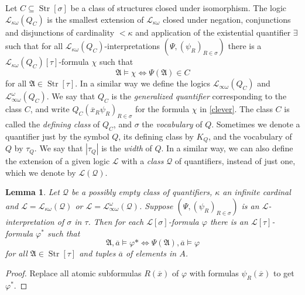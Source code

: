 \documentclass{ndjflart}
\theoremstyle{plain}
\newtheorem{lemma}[conjecture]{Lemma}
\theoremstyle{definition}
\numberwithin{equation}{section}
\DeclareMathOperator{\Str}{Str}
\begin{document}
Let $C \subseteq \Str[\sigma]$ be a class of structures closed under isomorphism.
The logic $\mathcal{L}_{\kappa\omega}(Q_C)$ is the smallest extension of $\mathcal{L}_{\kappa\omega}$ closed under negation, conjunctions and disjunctions of cardinality $<\kappa$ and application of the existential quantifier $\exists$ such that  for all
$\mathcal{L}_{\kappa\omega}(Q_C)$-interpretations $(\Psi,(\psi_R)_{R\in \sigma})$ there is a $\mathcal{L}_{\kappa\omega}(Q_C)[\tau]$-formula $\chi$ such that
\begin{equation}\label{clever}
	\mathfrak{A} \vDash \chi \Leftrightarrow \Psi(\mathfrak{A})\in C
\end{equation}
for all $\mathfrak{A} \in \Str[\tau]$.
In a similar way we define the logics $\mathcal{L}_{\infty \omega}(Q_C)$ and $\mathcal{L}^{\omega}_{\infty\omega}(Q_C)$.
We say that $Q_C$ is the \emph{generalized quantifier} corresponding to the class $C$, and write $Q_C(\overline{x}_R\psi_R)_{R\in\sigma}$ for the formula $\chi$ in \eqref{clever}.
The class $C$ is called the \emph{defining class} of $Q_C$, and $\sigma$ the \emph{vocabulary} of $Q$.
Sometimes we denote a quantifier just by the symbol $Q$, its defining class by $K_Q$, and the vocabulary of $Q$ by $\tau_Q$.
We say that $|\tau_Q|$ is the \emph{width} of $Q$.
In a similar way,
we can also define the extension of a given logic $\mathcal{L}$ with a \emph{class} $\mathcal{Q}$ of quantifiers, instead of just one, which we denote by $\mathcal{L}(\mathcal{Q})$.

\begin{lemma}\label{interpr}
Let $\mathcal{Q}$ be a possibly empty class of quantifiers, $\kappa$ an infinite cardinal and $\mathcal{L} = \mathcal{L}_{\kappa \omega}(\mathcal{Q})$ or $\mathcal{L} = \mathcal{L}^{\omega}_{\infty\omega}(\mathcal{Q})$.
Suppose $(\Psi,(\psi_R)_{R\in \sigma})$ is an $\mathcal{L}$-interpretation of $\sigma$ in $\tau$.
Then for each $\mathcal{L}[\sigma]$-formula $\varphi$ there is an $\mathcal{L}[\tau]$-formula $\varphi^*$ such that
\[
	\mathfrak{A},\overline{a} \vDash \varphi* \Leftrightarrow \Psi(\mathfrak{A}),\overline{a} \vDash \varphi 
\]
for all $\mathfrak{A} \in \Str[\tau]$ and tuples $\overline{a}$ of elements in $A$.
\end{lemma}
\begin{proof}
Replace all atomic subformulas $R(\overline{x})$ of $\varphi$ with formulas $\psi_R(\overline{x})$ to get $\varphi^*$. 
\end{proof}
\end{document}
